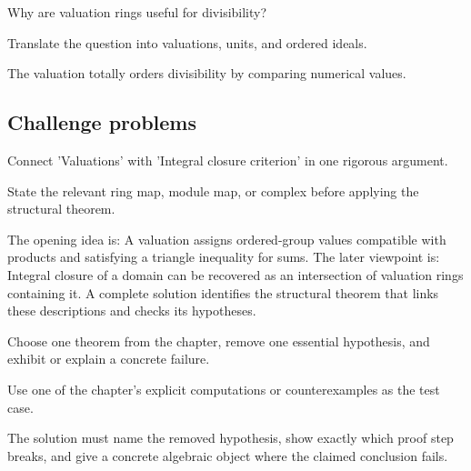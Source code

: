 \begin{exercise}[Divisibility]\label{exr:v21-expand-14}
Why are valuation rings useful for divisibility?
\end{exercise}
\begin{hint}
Translate the question into valuations, units, and ordered ideals.
\end{hint}
\begin{solution}
The valuation totally orders divisibility by comparing numerical values.
\end{solution}

\subsection*{Challenge problems}

\begin{exercise}\label{exr:v21-expand-15}
Connect 'Valuations' with 'Integral closure criterion' in one rigorous argument.
\end{exercise}
\begin{hint}
State the relevant ring map, module map, or complex before applying the structural theorem.
\end{hint}
\begin{solution}
The opening idea is: A valuation assigns ordered-group values compatible with products and satisfying a triangle inequality for sums. The later viewpoint is: Integral closure of a domain can be recovered as an intersection of valuation rings containing it. A complete solution identifies the structural theorem that links these descriptions and checks its hypotheses.
\end{solution}

\begin{exercise}\label{exr:v21-expand-16}
Choose one theorem from the chapter, remove one essential hypothesis, and exhibit or explain a concrete failure.
\end{exercise}
\begin{hint}
Use one of the chapter's explicit computations or counterexamples as the test case.
\end{hint}
\begin{solution}
The solution must name the removed hypothesis, show exactly which proof step breaks, and give a concrete algebraic object where the claimed conclusion fails.
\end{solution}

